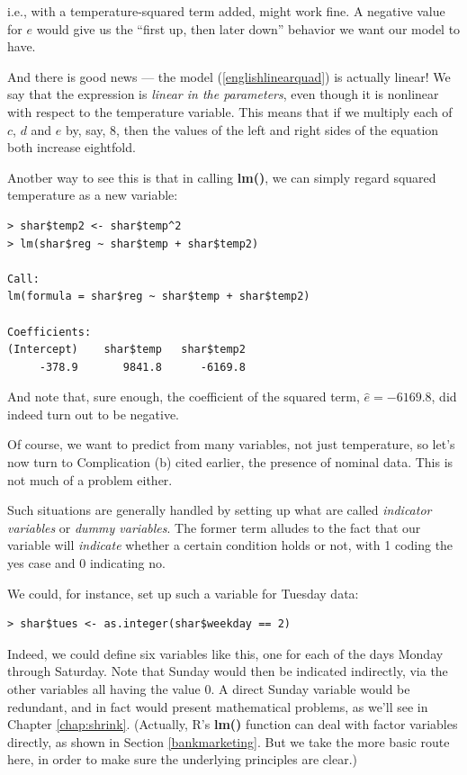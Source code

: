 i.e., with a temperature-squared term added, might work fine.  A
negative value for $e$ would give us the ``first up, then later down''
behavior we want our model to have.

And there is good news --- the model (\ref{englishlinearquad}) is
actually linear!  We say that the expression is {\it linear in the
parameters}, even though it is nonlinear with respect to the temperature
variable.  This means that if we multiply each of $c$, $d$ and $e$ by,
say, 8, then the values of the left and right sides of the equation both
increase eightfold.  

Anotber way to see this is that in calling {\bf lm()}, we can simply
regard squared temperature as a new variable:

\begin{lstlisting}
> shar$temp2 <- shar$temp^2
> lm(shar$reg ~ shar$temp + shar$temp2)

Call:
lm(formula = shar$reg ~ shar$temp + shar$temp2)

Coefficients:
(Intercept)    shar$temp   shar$temp2  
     -378.9       9841.8      -6169.8 
\end{lstlisting}

And note that, sure enough, the coefficient of the squared term,
$\widehat{e} = -6169.8$, did indeed turn out to be negative.

Of course, we want to predict from many variables, not just temperature,
so let's now turn to Complication (b) cited earlier, the presence of
nominal data.  This is not much of a problem either.

Such situations are generally handled by setting up what are called {\it
indicator variables} or {\it dummy variables}.  The former term alludes
to the fact that our variable will {\it indicate} whether a certain
condition holds or not, with 1 coding the yes case and 0 indicating no.

We could, for instance, set up such a variable for Tuesday data:

\begin{lstlisting}
> shar$tues <- as.integer(shar$weekday == 2)
\end{lstlisting}

Indeed, we could define six variables like this, one for each of the
days Monday through Saturday.  Note that Sunday would then be indicated
indirectly, via the other variables all having the value 0.  A direct
Sunday variable would be redundant, and in fact would present
mathematical problems, as we'll see in Chapter \ref{chap:shrink}.
(Actually, R's {\bf lm()} function can deal with factor variables
directly, as shown in Section \ref{bankmarketing}.  But we take the more
basic route here, in order to make sure the underlying principles are
clear.)

